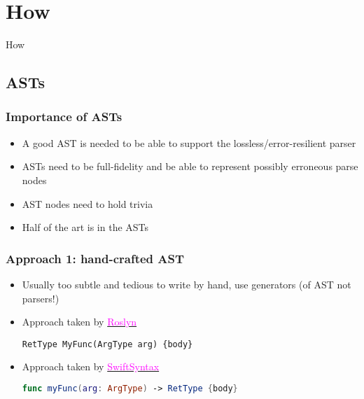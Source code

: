 \documentclass[compress,12pt,xcolor={dvipsnames}]{beamer}
\let\oldhref\href
\renewcommand{\href}[2]{\oldhref{#1}{\textcolor{magenta}{#2}}}
\begin{document}
\section{How}

\begin{frame}[standout]
	\centering\large
	How
\end{frame}

\subsection{ASTs}

\begin{frame}
	\frametitle{Importance of ASTs}
	\begin{itemize}
		\item A good AST is needed to be able to support the lossless/error-resilient parser
		\item ASTs need to be full-fidelity and be able to represent possibly erroneous parse nodes
		\item AST nodes need to hold trivia
		\item Half of the art is in the ASTs
	\end{itemize}
\end{frame}


\begin{frame}[fragile]
	\frametitle{Approach 1: hand-crafted AST}
	\begin{itemize}
		\item Usually too subtle and tedious to write by hand, use generators (of AST not parsers!)
		\item Approach taken by \href{https://github.com/dotnet/roslyn/blob/Visual-Studio-2019-Version-16.11/src/Compilers/CSharp/Portable/Generated/CSharpSyntaxGenerator/CSharpSyntaxGenerator.SourceGenerator/Syntax.xml.Internal.Generated.cs}{Roslyn}
		      \begin{lstlisting}[language={[Sharp]C}, gobble=12, numbers=off]
                  RetType MyFunc(ArgType arg) {body}
              \end{lstlisting}
		\item Approach taken by \href{https://github.com/apple/swift-syntax/blob/caab6bb82e0e81395551ec1032984f4b325f7a35/Sources/SwiftSyntax/generated/syntaxNodes/SyntaxNodesEF.swift#L3368}{SwiftSyntax}
		      \begin{lstlisting}[language=Swift, gobble=18, numbers=off]
                  func myFunc(arg: ArgType) -> RetType {body}
              \end{lstlisting}
	\end{itemize}
\end{frame}
\end{document}
